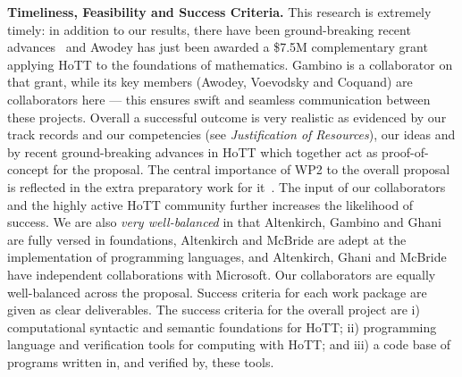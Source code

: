 \documentclass[a4paper,11pt]{article}
\begin{document}
{\bf Timeliness, Feasibility and Success Criteria.}  This research is
extremely timely: in addition to our results, there have been
ground-breaking recent advances~\cite{ShulmanM:uniidh,BezemM:cubsmt,
  nominal} and Awodey has just been awarded a \$7.5M complementary
grant applying HoTT to the foundations of mathematics. Gambino is a %
collaborator on that grant, while its key members (Awodey, Voevodsky
and Coquand) are collaborators here --- this ensures swift and
seamless communication between these projects.  Overall a successful
outcome is very realistic as evidenced by our track records and our
competencies (see {\em Justification of Resources}), our ideas and by
recent ground-breaking advances in HoTT which together act as
proof-of-concept for the proposal. The central importance of WP2 to
the overall proposal is reflected in the extra preparatory work for
it~\cite{alti-ctt,txa-ihp14}.  The input of our collaborators and the
highly active HoTT community further increases the likelihood of
success. We are also {\em very well-balanced} in that Altenkirch,
Gambino and Ghani are fully versed in foundations, Altenkirch and
McBride are adept at the implementation of programming languages, and
Altenkirch, Ghani and McBride have independent collaborations with
Microsoft. Our collaborators are equally well-balanced across the
proposal. Success criteria for each work package are given as clear
deliverables. The success criteria for the overall project are i)
computational syntactic and semantic foundations for HoTT; ii)
programming language and verification tools for computing with HoTT;
and iii) a code base of programs written in, and verified by, these
tools.

\end{document}
